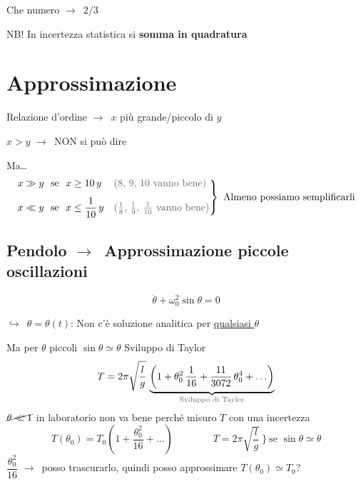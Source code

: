 \documentclass[11pt,a4paper,oneside]{book}
\newcommand{\grigio}[1]{{\color{grigio}#1}}
\newcommand{\fr}{\ensuremath{\rightarrow}}
\newcommand{\giu}{\ensuremath{\hookrightarrow}}
\newcommand{\chiave}[1]{\textbf{#1}}
\begin{document}
Che numero \fr\ $2/3$

\begin{spunto}
NB! In incertezza statistica si \chiave{somma in quadratura}
\end{spunto}

\section{Approssimazione}

Relazione d'ordine \fr\ $x$ più grande/piccolo di $y$

$x > y$ \fr\ NON si può dire

Ma\ldots
\[
  \left.
  \begin{aligned}
    &x \gg y \ \text{ se } \ x \geq 10\,y && \text{\grigio{($8$, $9$, $10$ vanno bene)}} \\[4pt]
    &x \ll y \ \text{ se } \ x \leq \frac{1}{10}\,y && \text{\grigio{($\tfrac{1}{8}$, $\tfrac{1}{9}$, $\tfrac{1}{10}$ vanno bene)}}
  \end{aligned}
  \right\}
  \ \text{Almeno possiamo semplificarli}
\]

\subsection*{Pendolo \fr\ Approssimazione piccole oscillazioni}
\begin{minipage}[c]{0.6\linewidth}
\[
  \ddot{\theta} + \omega_0^2 \sin\theta = 0
\]
\end{minipage}\hfill
\begin{minipage}[c]{0.3\linewidth}
\centering
{}
\end{minipage}

\giu\ $\theta = \theta(t)$: Non c'è soluzione analitica per \underline{qualsiasi $\theta$}

Ma per $\theta$ piccoli $\sin\theta \simeq \theta$ \quad Sviluppo di Taylor
\[
  T = 2\pi \sqrt{\frac{l}{g}}\, \underbrace{\left( 1 + \theta_0^2\, \frac{1}{16} + \frac{11}{3072}\, \theta_0^4 + \ldots \right)}_{\text{\grigio{Sviluppo di Taylor}}}
\]
$\cancel{\theta \ll 1}$ in laboratorio non va bene perché misuro $T$ con una incertezza
\[
  T(\theta_0) = T_0 \left( 1 + \frac{\theta_0^2}{16} + \ldots \right)
  \qquad\qquad
  T = 2\pi \sqrt{\frac{l}{g}} \ \bigr\}\ \text{se } \sin\theta \simeq \theta
\]
$\dfrac{\theta_0^2}{16}$ \fr\ posso trascurarlo, quindi posso approssimare $T(\theta_0) \simeq T_0$?
\end{document}
